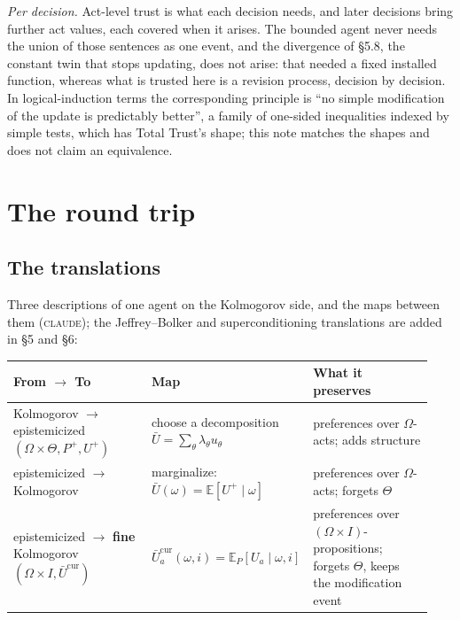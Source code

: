 \documentclass[11pt,a4paper]{article}
\newcommand{\E}{\mathbb{E}}
\newcommand{\Ucur}{\bar U^{\mathrm{cur}}}
\newcommand{\CLAUDE}{\textnormal{\scshape claude}}
\begin{document}
\emph{Per decision.} Act-level trust is what each decision needs, and later decisions bring further act values, each covered when it arises. The bounded agent never needs the union of those sentences as one event, and the divergence of \S5.8, the constant twin that stops updating, does not arise: that needed a fixed installed function, whereas what is trusted here is a revision process, decision by decision. In logical-induction terms the corresponding principle is ``no simple modification of the update is predictably better'', a family of one-sided inequalities indexed by simple tests, which has Total Trust's shape; this note matches the shapes and does not claim an equivalence.

\section{The round trip}

\subsection{The translations}
Three descriptions of one agent on the Kolmogorov side, and the maps between them (\CLAUDE); the Jeffrey--Bolker and superconditioning translations are added in \S5 and \S6:

\begin{center}\small
\begin{tabular}{@{}>{\raggedright\arraybackslash}p{0.34\linewidth}>{\raggedright\arraybackslash}p{0.30\linewidth}>{\raggedright\arraybackslash}p{0.30\linewidth}@{}}
\toprule
From $\to$ To & Map & What it preserves \\
\midrule
Kolmogorov $\to$ epistemicized $(\Omega \times \Theta, P^+, U^+)$ & choose a decomposition $\bar U = \sum_\theta \lambda_\theta u_\theta$ & preferences over $\Omega$-acts; adds structure \\
epistemicized $\to$ Kolmogorov & marginalize: $\bar U(\omega) = \E[U^+ \mid \omega]$ & preferences over $\Omega$-acts; forgets $\Theta$ \\
epistemicized $\to$ \textbf{fine} Kolmogorov $(\Omega \times I, \Ucur)$ & $\Ucur_a(\omega, i) = \E_P[U_a \mid \omega, i]$ & preferences over $(\Omega \times I)$-propositions; forgets $\Theta$, keeps the modification event \\
\bottomrule
\end{tabular}
\end{center}
\end{document}

